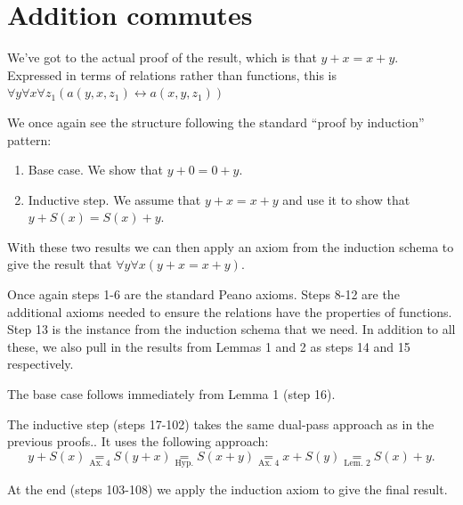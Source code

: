 \documentclass[10pt]{article}
\begin{document}
\section*{Addition commutes}

We've got to the actual proof of the result, which is that $y + x = x + y$. Expressed in terms of relations rather than functions, this is $\forall y \forall x \forall z_1 (a(y, x, z_1) \leftrightarrow a(x, y, z_1))$

We once again see the structure following the standard ``proof by induction'' pattern:

\begin{enumerate}
\item Base case. We show that $y + 0 = 0 + y$.
\item Inductive step. We assume that $y + x = x + y$ and use it to show that $y + S(x) = S(x) + y$.
\end{enumerate}

With these two results we can then apply an axiom from the induction schema to give the result that $\forall y \forall x (y + x = x + y)$.

Once again steps 1-6 are the standard Peano axioms. Steps 8-12 are the additional axioms needed to ensure the relations have the properties of functions. Step 13 is the instance from the induction schema that we need. In addition to all these, we also pull in the results from Lemmas 1 and 2 as steps 14 and 15 respectively.

The base case follows immediately from Lemma 1 (step 16).

The inductive step (steps 17-102) takes the same dual-pass approach as in the previous proofs.. It uses the following approach:
$$
y + S(x) \underset{\text{Ax. 4}}{=} S(y + x) \underset{\text{Hyp.}}{=} S(x + y) \underset{\text{Ax. 4}}{=} x + S(y) \underset{\text{Lem. 2}}{=} S(x) + y.
$$

At the end (steps 103-108) we apply the induction axiom to give the final result.
\end{document}
